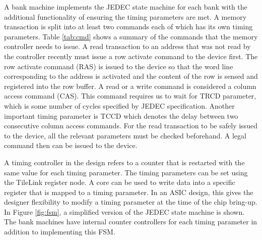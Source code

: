 A bank machine implements the JEDEC state machine for each bank with the additional functionality of ensuring the timing parameters are met. 
A memory transaction is split into at least two commands each of which has its own timing parameters. Table \ref{tab:cmd} shows a summary of the commands that the memory controller needs to issue. A read transaction to an address that was not read by the controller recently must issue a row activate command to the device first. The row activate command (RAS) is issued to the device so that the word line corresponding to the address is activated and the content of the row is sensed and registered into the row buffer. A read or a write command is considered a column access command (CAS). This command requires us to wait for TRCD parameter, which is some number of cycles specified by JEDEC specification. Another important timing parameter is TCCD which denotes the delay between two consecutive column access commands. For the read transaction to be safely issued to the device, all the relevant parameters must be checked beforehand. A legal command then can be issued to the device. 

A timing controller in the design refers to a counter that is restarted with the same value for each timing parameter. The timing parameters can be set using the TileLink register node. A core can be used to write data into a specific register that is mapped to a timing parameter. In an ASIC design, this gives the designer flexibility to modify a timing parameter at the time of the chip bring-up. In Figure \ref{fig:fsm}, a simplified version of the JEDEC state machine is shown. The bank machines have internal counter controllers for each timing parameter in addition to implementing this FSM.

